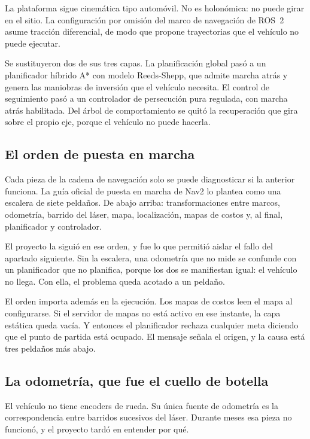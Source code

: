 La plataforma sigue cinemática tipo automóvil. No es holonómica: no puede girar
en el sitio. La configuración por omisión del marco de navegación de ROS~2 asume
tracción diferencial, de modo que propone trayectorias que el vehículo no puede
ejecutar.

Se sustituyeron dos de sus tres capas. La planificación global pasó a un
planificador híbrido A* con modelo Reeds-Shepp, que admite marcha atrás y genera
las maniobras de inversión que el vehículo necesita. El control de seguimiento
pasó a un controlador de persecución pura regulada, con marcha atrás habilitada.
Del árbol de comportamiento se quitó la recuperación que gira sobre el propio
eje, porque el vehículo no puede hacerla.

\subsection{El orden de puesta en marcha}

Cada pieza de la cadena de navegación solo se puede diagnosticar si la anterior
funciona. La guía oficial de puesta en marcha de Nav2 \autocite{nav2setup} lo
plantea como una escalera de siete peldaños. De abajo arriba: transformaciones
entre marcos, odometría, barrido del láser, mapa, localización, mapas de costos
y, al final, planificador y controlador.

El proyecto la siguió en ese orden, y fue lo que permitió aislar el fallo del
apartado siguiente. Sin la escalera, una odometría que no mide se confunde con un
planificador que no planifica, porque los dos se manifiestan igual: el vehículo no
llega. Con ella, el problema queda acotado a un peldaño.

El orden importa además en la ejecución. Los mapas de costos leen el mapa al
configurarse. Si el servidor de mapas no está activo en ese instante, la capa
estática queda vacía. Y entonces el planificador rechaza cualquier meta diciendo
que el punto de partida está ocupado. El mensaje señala el origen, y la causa está tres
peldaños más abajo.

\subsection{La odometría, que fue el cuello de botella}

El vehículo no tiene encoders de rueda. Su única fuente de odometría es la
correspondencia entre barridos sucesivos del láser. Durante meses esa pieza no
funcionó, y el proyecto tardó en entender por qué.

